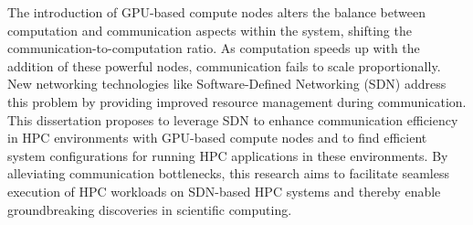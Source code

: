 The introduction of
GPU-based compute nodes
alters the balance between computation and communication aspects within the
system, shifting the communication-to-computation ratio.
As computation speeds up with the addition of these powerful
nodes, communication fails to scale proportionally. New networking
technologies like Software-Defined Networking (SDN) address
this problem by providing
improved resource management during communication.
This dissertation proposes to leverage SDN to enhance
communication efficiency in HPC environments with GPU-based compute nodes
and to find efficient system configurations for running
HPC applications in these environments. By alleviating communication
bottlenecks, this research aims to facilitate seamless execution of HPC
workloads on SDN-based HPC systems and thereby enable groundbreaking discoveries in scientific computing.
